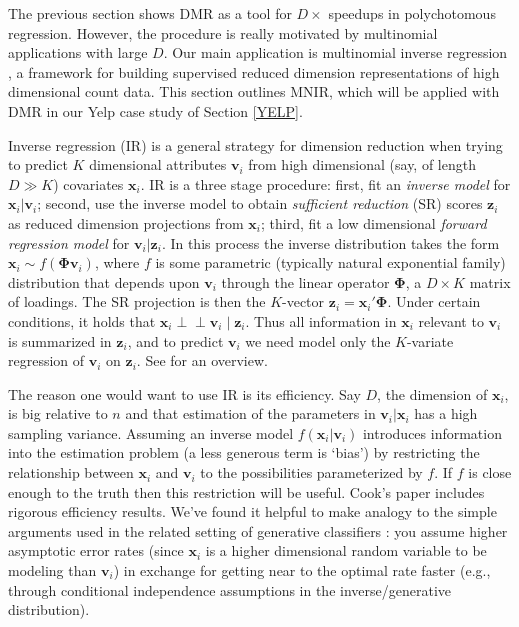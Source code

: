 \documentclass[12pt]{article}
\newcommand{\bs}[1]{\boldsymbol{#1}}
\newcommand{\bm}[1]{\mathbf{#1}}
\newcommand{\indep}{\perp\!\!\!\perp}
\begin{document}
The previous section shows DMR as a tool for $D\times$ speedups in
polychotomous regression.  However, the procedure is really motivated by
multinomial applications with large $D$.  Our main application is multinomial
inverse regression \citep[MNIR][]{taddy_multinomial_2013}, a framework for
building supervised reduced dimension representations of high dimensional
count data.  This section outlines MNIR, which will be applied with DMR in our
Yelp case study of Section \ref{YELP}.

Inverse regression (IR) is a general strategy for dimension reduction when
trying to predict $K$ dimensional attributes $\bm{v}_i$ from high dimensional
(say, of length $D \gg K$) covariates $\bm{x}_i$.  IR is a three stage
procedure: first, fit an {\it inverse model} for $\bm{x}_i | \bm{v}_i$;
second, use the inverse model to obtain {\it sufficient reduction} (SR) scores
$\bm{z}_i$ as reduced dimension projections from $\bm{x}_i$; third, fit a low
dimensional {\it forward regression model} for $\bm{v}_i | \bm{z}_i$.   In
this process the inverse distribution takes the form $\bm{x}_i \sim
f(\bs{\Phi}\bm{v}_i)$, where $f$ is some parametric (typically natural
exponential family) distribution that depends upon $\bm{v}_i$ through the
linear operator $\bs{\Phi}$, a $D\times K$ matrix of loadings.  The SR
projection is then the $K$-vector $\bm{z}_i = \bm{x}_i'\bs{\Phi}$. Under
certain conditions, it  holds that $\bm{x}_i \indep \bm{v}_i \mid \bm{z}_i$.
Thus all information in $\bm{x}_i$ relevant to $\bm{v}_i$ is summarized in
$\bm{z}_i$, and to predict $\bm{v}_i$ we need model only the $K$-variate
regression of $\bm{v}_i$ on $\bm{z}_i$. See \citet{cook_fisher_2007} for an
overview.

The reason one would want to use IR is its efficiency.  Say $D$, the dimension
of $\bm{x}_i$, is big relative to $n$ and that estimation of the parameters in
$\bm{v}_i |\bm{x}_i$ has a high sampling variance.  Assuming an inverse model
$f(\bm{x}_i | \bm{v}_i)$ introduces information into the estimation problem (a
less generous term is `bias') by restricting the relationship between
$\bm{x}_i$ and $\bm{v}_i$ to the possibilities parameterized by $f$.  If $f$
is close enough to the truth then this restriction will be useful.  Cook's
paper includes rigorous efficiency results.  We've found it helpful to make
analogy to the simple arguments used in the related setting of generative
classifiers \citep[e.g., as in][for Gaussian
discrimination]{efron_efficiency_1975}: you  assume higher asymptotic error
rates (since $\bm{x}_i$ is a higher dimensional random variable to be modeling
than $\bm{v}_i$) in exchange for getting near to the optimal rate faster
(e.g., through conditional independence assumptions in the inverse/generative
distribution).
\end{document}
